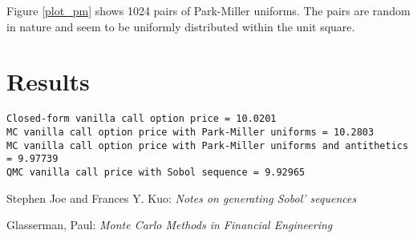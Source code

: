 \documentclass[letterpaper,twoside,11pt,fleqn]{article}
\begin{document}
Figure \ref{plot_pm} shows 1024 pairs of Park-Miller uniforms. The pairs are random in nature and seem to be uniformly distributed within the unit square.

\clearpage

\section*{Results}

\begin{verbatim}
Closed-form vanilla call option price = 10.0201
MC vanilla call option price with Park-Miller uniforms = 10.2803
MC vanilla call option price with Park-Miller uniforms and antithetics = 9.97739
QMC vanilla call price with Sobol sequence = 9.92965
\end{verbatim}


\begin{thebibliography}{1}
	Stephen Joe and Frances Y. Kuo:
	{\em Notes on generating Sobol' sequences}

	Glasserman, Paul:
	{\em Monte Carlo Methods in Financial Engineering}

\end{thebibliography}
\end{document}
